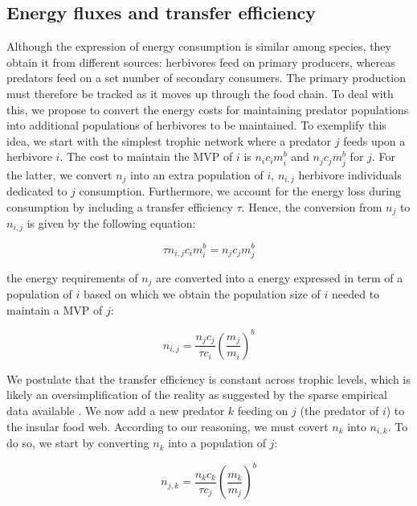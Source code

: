\subsection{Energy fluxes and transfer
efficiency}\label{energy-fluxes-and-transfer-efficiency}

Although the expression of energy consumption is similar among species,
they obtain it from different sources: herbivores feed on primary
producers, whereas predators feed on a set number of secondary
consumers. The primary production must therefore be tracked as it moves
up through the food chain. To deal with this, we propose to convert the
energy costs for maintaining predator populations into additional
populations of herbivores to be maintained. To exemplify this idea, we
start with the simplest trophic network where a predator \(j\) feeds
upon a herbivore \(i\). The cost to maintain the MVP of \(i\) is
\(n_ic_im_i^b\) and \(n_jc_jm_j^b\) for \(j\). For the latter, we
convert \(n_j\) into an extra population of \(i\), \(n_{i,j}\) herbivore
individuals dedicated to \(j\) consumption. Furthermore, we account for
the energy loss during consumption by including a transfer efficiency
\citep[sensu][]{Lindeman1942} \(\tau\). Hence, the conversion from
\(n_{j}\) to \(n_{i,j}\) is given by the following equation:

\begin{equation} \tau n_{i,j} c_im_i^b = n_jc_jm_j^b \label{eq:chp4id1}\end{equation}

the energy requirements of \(n_j\) are converted into a energy expressed
in term of a population of \(i\) based on which we obtain the population
size of \(i\) needed to maintain a MVP of \(j\):

\begin{equation} n_{i,j} = \frac{n_jc_j}{\tau c_i} \left( \frac{m_j}{m_i} \right)^b \label{eq:chp4id2}\end{equation}

We postulate that the transfer efficiency is constant across trophic
levels, which is likely an oversimplification of the reality as
suggested by the sparse empirical data available
\citep{Trebilco2013, Brown2003}. We now add a new predator \(k\) feeding
on \(j\) (the predator of \(i\)) to the insular food web. According to
our reasoning, we must covert \(n_k\) into \(n_{i,k}\). To do so, we
start by converting \(n_k\) into a population of \(j\):

\begin{equation} n_{j,k} = \frac{n_kc_k}{\tau c_j} \left( \frac{m_k}{m_j} \right)^b \label{eq:chp4id2}\end{equation}

